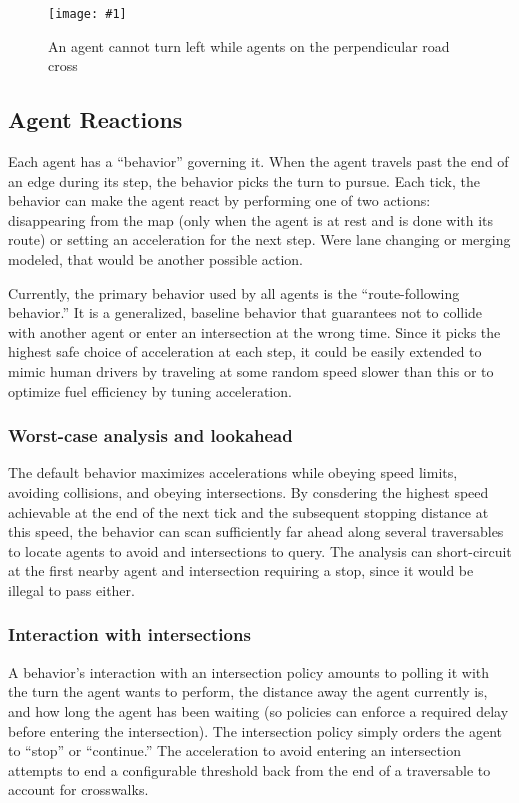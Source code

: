 \documentclass[letterpaper, 10 pt, conference]{ieeeconf}  %
\newcommand{\pix}[3]{
  \begin{figure}[h]
    \centering \texttt{[image: \#1]}
    \caption{#2}
  \end{figure}
}
\begin{document}
\pix{turn_conflicts.png}
    {An agent cannot turn left while agents on the perpendicular road cross}
    {scale=0.5}

\subsection{Agent Reactions}

Each agent has a ``behavior'' governing it. When the agent travels past the end
of an edge during its step, the behavior picks the turn to pursue. Each tick,
the behavior can make the agent react by performing one of two actions:
disappearing from the map (only when the agent is at rest and is done with its
route) or setting an acceleration for the next step. Were lane changing or
merging modeled, that would be another possible action.

Currently, the primary behavior used by all agents is the ``route-following
behavior.'' It is a generalized, baseline behavior that guarantees not to
collide with another agent or enter an intersection at the wrong time. Since it
picks the highest safe choice of acceleration at each step, it could be easily
extended to mimic human drivers by traveling at some random speed slower than
this or to optimize fuel efficiency by tuning acceleration.

\subsubsection{Worst-case analysis and lookahead}


The default behavior maximizes accelerations while obeying speed limits,
avoiding collisions, and obeying intersections. By consdering the highest speed
achievable at the end of the next tick and the subsequent stopping distance at
this speed, the behavior can scan sufficiently far ahead along several
traversables to locate agents to avoid and intersections to query. The analysis
can short-circuit at the first nearby agent and intersection requiring a stop,
since it would be illegal to pass either.

\subsubsection{Interaction with intersections}


A behavior's interaction with an intersection policy amounts to polling it with
the turn the agent wants to perform, the distance away the agent currently is,
and how long the agent has been waiting (so policies can enforce a required
delay before entering the intersection). The intersection policy simply orders
the agent to ``stop'' or ``continue.'' The acceleration to avoid entering an intersection
attempts to end a configurable threshold back from the end of a traversable to
account for crosswalks.
\end{document}
